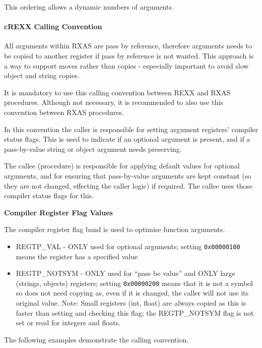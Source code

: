 This ordering allows a dynamic numbers of arguments.

\hypertarget{crexx-calling-convention}{%
\paragraph{cREXX Calling Convention}\label{crexx-calling-convention}}

All arguments within RXAS are pass by reference, therefore arguments
needs to be copied to another register if pass by reference is not
wanted. This approach is a way to support moves rather than copies -
especially important to avoid slow object and string copies.

It is mandatory to use this calling convention between REXX and RXAS
procedures. Although not necessary, it is recommended to also use this
convention between RXAS procedures.

In this convention the caller is responsible for setting argument
registers' compiler status flags. This is used to indicate if an optional argument is
present, and if a pass-by-value string or object argument needs
preserving.

The callee (procedure) is responsible for applying default values for
optional arguments, and for ensuring that pass-by-value arguments are
kept constant (so they are not changed, effecting the caller logic) if
required. The callee uses those compiler status flags for this.

\textbf{Compiler Register Flag Values}

The compiler register flag band is used to optimise function arguments.

\begin{itemize}
\item
  REGTP\_VAL - ONLY used for optional arguments; setting
  \texttt{0x00000100} means the register has a specified value
\item
  REGTP\_NOTSYM - ONLY used for ``pass be value'' and ONLY large
  (strings, objects) registers; setting \texttt{0x00000200} means that it is not a
  symbol so does not need copying as, even if it is changed, the caller
  will not use its original value. Note: Small registers (int, float)
  are always copied as this is faster than setting and checking this
  flag; the REGTP\_NOTSYM flag is not set or read for integers and
  floats.
\end{itemize}

The following examples demonstrate the calling convention.

